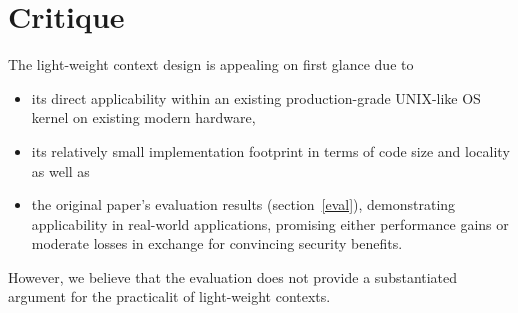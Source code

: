 \documentclass[10pt,twocolumn,letter]{article}
\begin{document}

\section{Critique}\label{eval:crit}
The light-weight context design is appealing on first glance due to
\begin{itemize}
  \item its direct applicability within an existing production-grade UNIX-like OS kernel on existing modern hardware,
  \item its relatively small implementation footprint in terms of code size and locality as well as
  \item the original paper's evaluation results (section~\ref{eval}), demonstrating applicability in real-world applications, promising either performance gains or moderate losses in exchange for convincing security benefits.
\end{itemize}
However, we believe that the evaluation does not provide a substantiated argument for the practicalit of light-weight contexts.
\end{document}
